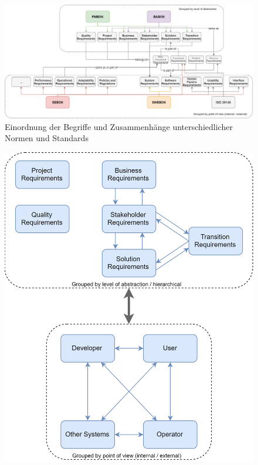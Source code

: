 \begin{figure}[htbp]
 \centering
 \includegraphics[width=1.0\textwidth]{gfx/Requirements.png}
 \caption{Einordnung der Begriffe und Zusammenhänge unterschiedlicher Normen und Standards}
 \label{fig:chapter05:requirements}
\end{figure}


\begin{figure}[htbp]
 \centering
 \includegraphics[width=1.0\textwidth]{gfx/Requirements_Grouping.png}
 \caption{}
 \label{fig:chapter05:requirements_grouping}
\end{figure}


